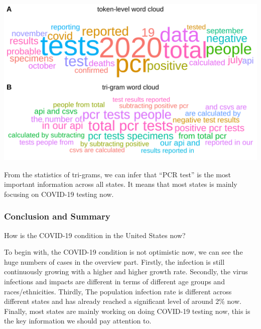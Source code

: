 \documentclass[
]{article}
\begin{document}
\begin{center}\includegraphics[width=1\linewidth]{wordcloud} \end{center}

From the statistics of tri-grams, we can infer that ``PCR test'' is the
most important information across all states. It means that most states
is mainly focusing on COVID-19 testing now.

\hypertarget{conclusion-and-summary}{%
\subsubsection{Conclusion and Summary}\label{conclusion-and-summary}}

How is the COVID-19 condition in the United States now?

To begin with, the COVID-19 condition is not optimistic now, we can see
the huge numbers of cases in the overview part. Firstly, the infection
is still continuously growing with a higher and higher growth rate.
Secondly, the virus infections and impacts are different in terms of
different age groups and races/ethnicities. Thirdly, The population
infection rate is different across different states and has already
reached a significant level of around 2\% now. Finally, most states are
mainly working on doing COVID-19 testing now, this is the key
information we should pay attention to.
\end{document}

